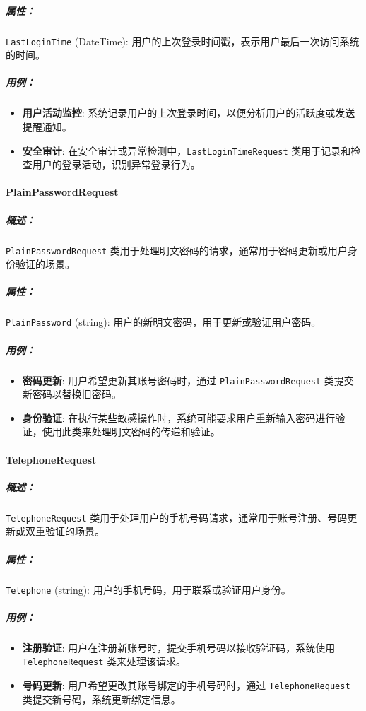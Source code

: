 \subparagraph{属性：}

\texttt{LastLoginTime} (DateTime): 用户的上次登录时间戳，表示用户最后一次访问系统的时间。

\subparagraph{用例：}
\begin{itemize}
	\item \textbf{用户活动监控}: 系统记录用户的上次登录时间，以便分析用户的活跃度或发送提醒通知。
	\item \textbf{安全审计}: 在安全审计或异常检测中，\texttt{LastLoginTimeRequest} 类用于记录和检查用户的登录活动，识别异常登录行为。
\end{itemize}

\paragraph{PlainPasswordRequest}
\subparagraph{概述：} \texttt{PlainPasswordRequest} 类用于处理明文密码的请求，通常用于密码更新或用户身份验证的场景。

\subparagraph{属性：}

\texttt{PlainPassword} (string): 用户的新明文密码，用于更新或验证用户密码。

\subparagraph{用例：}
\begin{itemize}
	\item \textbf{密码更新}: 用户希望更新其账号密码时，通过 \texttt{PlainPasswordRequest} 类提交新密码以替换旧密码。
	\item \textbf{身份验证}: 在执行某些敏感操作时，系统可能要求用户重新输入密码进行验证，使用此类来处理明文密码的传递和验证。
\end{itemize}

\paragraph{TelephoneRequest}
\subparagraph{概述：} \texttt{TelephoneRequest} 类用于处理用户的手机号码请求，通常用于账号注册、号码更新或双重验证的场景。

\subparagraph{属性：}

\texttt{Telephone} (string): 用户的手机号码，用于联系或验证用户身份。

\subparagraph{用例：}
\begin{itemize}
	\item \textbf{注册验证}: 用户在注册新账号时，提交手机号码以接收验证码，系统使用 \texttt{TelephoneRequest} 类来处理该请求。
	\item \textbf{号码更新}: 用户希望更改其账号绑定的手机号码时，通过 \texttt{TelephoneRequest} 类提交新号码，系统更新绑定信息。
\end{itemize}

